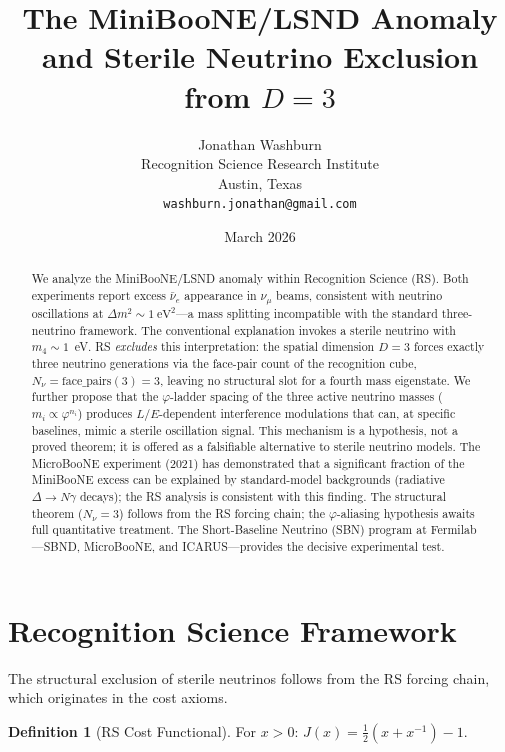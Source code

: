 \documentclass[12pt,a4paper]{article}
\title{The MiniBooNE/LSND Anomaly and Sterile Neutrino Exclusion\\
from $D = 3$}
\author{Jonathan Washburn\\
Recognition Science Research Institute\\
Austin, Texas\\
\texttt{washburn.jonathan@gmail.com}}
\date{March 2026}
\theoremstyle{definition}
\newtheorem{definition}[theorem]{Definition}
\theoremstyle{remark}
\begin{document}
\maketitle

\begin{abstract}
We analyze the MiniBooNE/LSND anomaly within Recognition Science (RS).
Both experiments report excess $\bar{\nu}_e$ appearance in $\nu_\mu$
beams, consistent with neutrino oscillations at $\Delta m^2 \sim
1~\mathrm{eV}^2$---a mass splitting incompatible with the standard
three-neutrino framework.  The conventional explanation invokes a
sterile neutrino with $m_4 \sim 1$~eV.  RS \emph{excludes} this
interpretation: the spatial dimension $D = 3$ forces exactly three
neutrino generations via the face-pair count of the recognition cube,
$N_\nu = \mathrm{face\_pairs}(3) = 3$, leaving no structural slot for a
fourth mass eigenstate.  We further propose that the $\varphi$-ladder
spacing of the three active neutrino masses
($m_i \propto \varphi^{n_i}$) produces $L/E$-dependent interference
modulations that can, at specific baselines, mimic a sterile oscillation
signal.  This mechanism is a hypothesis, not a proved theorem; it is
offered as a falsifiable alternative to sterile neutrino models.  The
MicroBooNE experiment (2021) has demonstrated that a significant fraction
of the MiniBooNE excess can be explained by standard-model backgrounds
(radiative $\Delta \to N\gamma$ decays); the RS analysis is consistent
with this finding.  The structural theorem ($N_\nu = 3$) follows from the RS forcing
chain; the $\varphi$-aliasing hypothesis awaits full quantitative
treatment.  The Short-Baseline Neutrino (SBN) program at
Fermilab---SBND, MicroBooNE, and ICARUS---provides the decisive
experimental test.
\end{abstract}

\section{Recognition Science Framework}
\label{sec:framework}

The structural exclusion of sterile neutrinos follows from the RS
forcing chain, which originates in the cost axioms.

\begin{definition}[RS Cost Functional]
For $x > 0$: $J(x) = \tfrac{1}{2}(x + x^{-1}) - 1$.
\end{definition}
\end{document}

